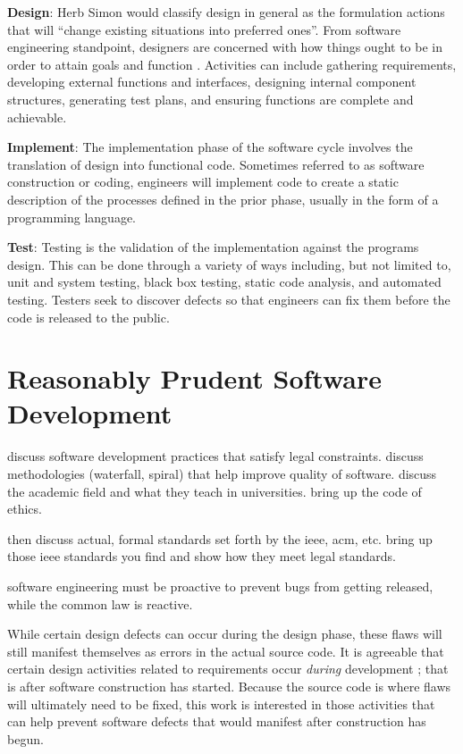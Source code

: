\documentclass[12pt]{report}
\begin{document}
\textbf{Design}: Herb Simon would classify design in general as the formulation actions that will ``change existing situations into preferred ones''. From software engineering standpoint, designers are concerned with how things ought to be in order to attain goals and function \cite{simon}. Activities can include gathering requirements, developing external functions and interfaces, designing internal component structures, generating test plans, and ensuring functions are complete and achievable.  

\textbf{Implement}: The implementation phase of the software cycle involves the translation of design into functional code. Sometimes referred to as software construction or coding, engineers will implement code to create a static description of the processes defined in the prior phase, usually in the form of a programming language.  

\textbf{Test}: Testing is the validation of the implementation against the programs design. This can be done through a variety of ways including, but not limited to, unit and system testing, black box testing, static code analysis, and automated testing. Testers seek to discover defects so that engineers can fix them before the code is released to the public.  

\section{Reasonably Prudent Software Development}  
discuss software development practices that satisfy legal constraints. discuss methodologies (waterfall, spiral) that help improve quality of software. discuss the academic field and what they teach in universities. bring up the code of ethics.   

then discuss actual, formal standards set forth by the ieee, acm, etc. bring up those ieee standards you find and show how they meet legal standards.   

software engineering must be proactive to prevent bugs from getting released, while the common law is reactive.  

While certain design defects can occur during the design phase, these flaws will still manifest themselves as errors in the actual source code. It is agreeable that certain design activities related to requirements occur \textit{during} development \cite{Turner99}; that is after software construction has started. Because the source code is where flaws will ultimately need to be fixed, this work is interested in those activities that can help prevent software defects that would manifest after construction has begun. 
\end{document}
